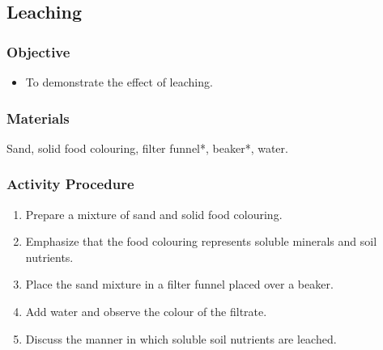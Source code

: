 \subsection{Leaching}

\subsubsection{Objective}
\begin{itemize}
\item{To demonstrate the effect of leaching.}
\end{itemize}

\subsubsection{Materials}
Sand, solid food colouring, filter funnel*, beaker*, water.

\subsubsection{Activity Procedure}
\begin{enumerate}
\item{Prepare a mixture of sand and solid food colouring.}
\item{Emphasize that the food colouring represents soluble minerals and soil nutrients.}
\item{Place the sand mixture in a filter funnel placed over a beaker.}
\item{Add water and observe the colour of the filtrate.}
\item{Discuss the manner in which soluble soil nutrients are leached.}
\end{enumerate}
